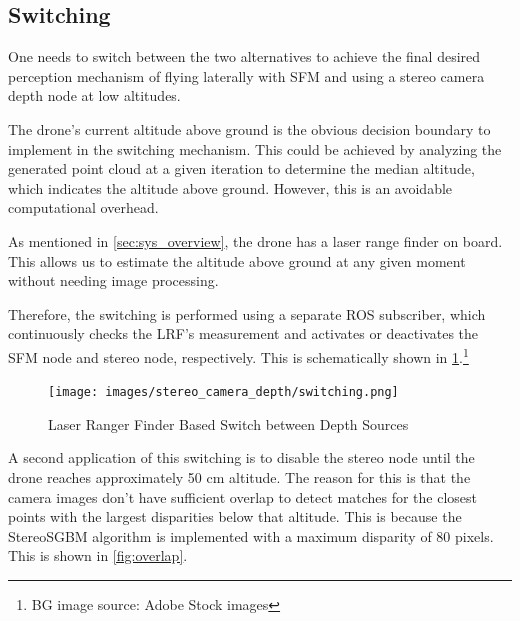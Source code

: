 
\subsection{Switching}\label{subsec:switching}

One needs to switch between the two alternatives to achieve the final desired perception mechanism of flying laterally with SFM and using a stereo camera depth node at low altitudes.

The drone's current altitude above ground is the obvious decision boundary to implement in the switching mechanism. This could be achieved by analyzing the generated point cloud at a given iteration to determine the median altitude, which indicates the altitude above ground. However, this is an avoidable computational overhead.

As mentioned in \cref{sec:sys_overview}, the drone has a laser range finder on board. This allows us to estimate the altitude above ground at any given moment without needing image processing.

Therefore, the switching is performed using a separate ROS subscriber, which continuously checks the LRF's measurement and activates or deactivates the SFM node and stereo node, respectively. This is schematically shown in \cref{fig:switching}.\footnote[1]{BG image source: Adobe Stock images
}

\begin{figure}[h]
    \centering  
    \texttt{[image: images/stereo\_camera\_depth/switching.png]}
    \caption{Laser Ranger Finder Based Switch between Depth Sources}
    \label{fig:switching}
\end{figure}

A second application of this switching is to disable the stereo node until the drone reaches approximately 50 cm altitude. The reason for this is that the camera images don't have sufficient overlap to detect matches for the closest points with the largest disparities below that altitude. This is because the StereoSGBM algorithm is implemented with a maximum disparity of 80 pixels. This is shown in \cref{fig:overlap}.

